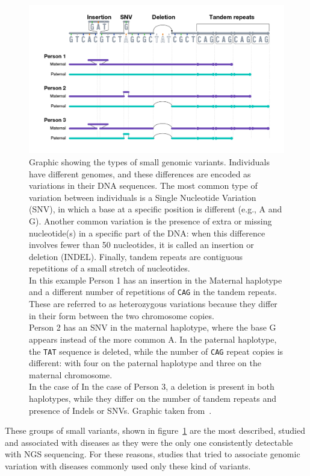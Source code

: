 \begin{figure}[H]
	\centering
	\includegraphics[width=\linewidth]{figures/background/small_variants.png}
	\caption[Small genomic variants.]{Graphic showing the types of small genomic variants. Individuals have different genomes, and these differences are encoded as variations in their DNA sequences. The most common type of variation between individuals is a Single Nucleotide Variation (\gls{SNV}), in which a base at a specific position is different (e.g., A and G). Another common variation is the presence of extra or missing nucleotide(s) in a specific part of the DNA: when this difference involves fewer than 50 nucleotides, it is called an insertion or deletion (INDEL). Finally, tandem repeats are contiguous repetitions of a small stretch of nucleotides.\\ In this example Person 1 has an insertion in the Maternal haplotype and a different number of repetitions of \texttt{CAG} in the tandem repeats. These are referred to as heterozygous variations because they differ in their form between the two chromosome copies.\\ Person 2 has an SNV in the maternal haplotype, where the base G appears instead of the more common A. In the paternal haplotype,  the \texttt{TAT} sequence is deleted, while the number of \texttt{CAG} repeat copies is different: with four on the paternal haplotype and three on the maternal chromosome. \\ In the case of In the case of Person 3, a deletion is present in both haplotypes, while they differ on the number of tandem repeats and presence of Indels or SNVs. Graphic taken from~\cite{nih_variation}.}
	\label{fig:small_variants}
\end{figure}
These groups of small variants, shown in figure~\ref{fig:small_variants} are the most described, studied and associated with diseases as they were the only one consistently detectable with NGS sequencing. For these reasons, studies that tried to associate genomic variation with diseases commonly used only these kind of variants.\\
